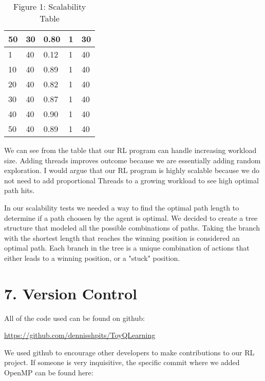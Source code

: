 \documentclass[12pt]{article}
\begin{document}
\begin{table}[H]
\begin{tabular}{|l|l|l|l|l|}
    \hline
    50      & 30        & 0.80                   & 1                & 30                \\ 
    \hline
    1       & 40        & 0.12                   & 1                & 40                \\ 
    \hline
    10      & 40        & 0.89                   & 1                & 40                \\ 
    \hline
    20      & 40        & 0.82                   & 1                & 40                \\ 
    \hline
    30      & 40        & 0.87                   & 1                & 40                \\ 
    \hline
    40      & 40        & 0.90                   & 1                & 40                \\ 
    \hline
    50      & 40        & 0.89                   & 1                & 40                \\
    \hline
    \end{tabular}
  \caption{Figure 1: Scalability Table}
\end{table}


We can see from the table that our RL program can handle
increasing workload size. Adding threads improves outcome because we are essentially adding random exploration. I would argue that our RL
program is highly scalable because we do not need to add 
proportional Threads to a growing workload to see high
optimal path hits.

In our scalability tests we needed a way to find the optimal path
length to determine if a path choosen by the agent is optimal. 
We decided to create a tree structure that modeled all the possible
combinations of paths. Taking the branch with the shortest length that 
reaches the winning position is considered an optimal path. Each 
branch in the tree is a unique combination of actions that either
leads to a winning position, or a "stuck" position.

\section*{7. Version Control}

\noindent All of the code used can be found on github:

\url{https://github.com/dennisshpits/ToyQLearning}

\noindent We used github to encourage other developers to make contributions
to our RL project. If someone is very inquisitive, the specific
commit where we added OpenMP can be found here:
\end{document}
